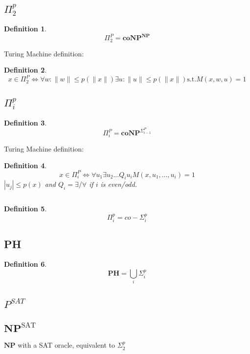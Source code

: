 \documentclass[]{article}
\theoremstyle{break}
\theoremstyle{break}
\newtheorem{definition}{Definition}[section]
\begin{document}
\subsection{$\Pi^p_2$}
\label{sec:pip2}
\begin{definition}
	$$\Pi_2^P = \hyperref[sec:coNP]{\textbf{coNP}^{\textbf{NP}}}$$
\end{definition}
$ $
\\
Turing Machine definition:
\begin{definition}
	$$x \in \Pi_2^P\iff \forall w : \|w\| \leq p(\|x\|) \exists u : \|u\| \leq p(\|x\|)\text{s.t.} M(x, w,u) = 1$$
\end{definition}
\subsection{$\Pi^p_i$}
\label{sec:pipi}
\begin{definition}
	$$\Pi_i^P = \hyperref[sec:coNP]{\textbf{coNP}}^{\hyperref[sec:sigmapi]{\Sigma_{i-1}^P}}$$
\end{definition}
$ $
\\
Turing Machine definition:
\begin{definition}
	$$x \in \Pi_i^P\iff \forall u_1\exists u_2 ... Q_i u_i M(x,u_1,...,u_i) = 1$$
	$|u_j| \leq p(x)$ and $Q_i=\exists/\forall$ if $i$ is even/odd.
\end{definition}
$ $
\\
\begin{definition}
	$$\Pi_i^p ={\hyperref[sec:sigmapi]{co-\Sigma_{i}^p}}$$
\end{definition}
\subsection{PH}
\label{sec:PH}
\begin{definition}
	$$\textbf{PH} =\bigcup_i\hyperref[sec:sigmapi]{\Sigma_{i}^p}$$
\end{definition}

\subsection{$P^{SAT}$}

\subsection{$\textbf{NP}^{\text{SAT}}$}
\label{sec:npsat}
$\textbf{NP}$ with a SAT oracle, equivalent to $\hyperref[sec:sigmap2]{\Sigma_2^p}$
\end{document}
